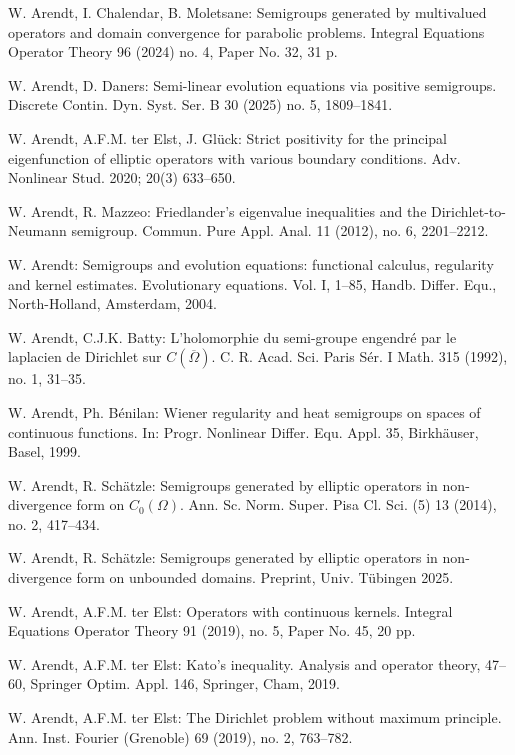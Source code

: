 \begin{thebibliography}{99}

 W. Arendt, I. Chalendar, B. Moletsane: Semigroups generated by multivalued operators and domain convergence for parabolic problems. Integral Equations Operator Theory 96 (2024) no. 4, Paper No. 32, 31 p.

 W. Arendt, D. Daners: Semi-linear evolution equations via positive semigroups. Discrete Contin. Dyn. Syst. Ser. B 30 (2025) no. 5, 1809--1841.

 W. Arendt, A.F.M. ter Elst, J. Glück: Strict positivity for the principal eigenfunction of elliptic operators with various boundary conditions. Adv. Nonlinear Stud. 2020; 20(3) 633--650.

 W. Arendt, R. Mazzeo: Friedlander's eigenvalue inequalities and the Dirichlet-to-Neumann semigroup. Commun. Pure Appl. Anal. 11 (2012), no. 6, 2201--2212.

 W. Arendt: Semigroups and evolution equations: functional calculus, regularity and kernel estimates. Evolutionary equations. Vol. I, 1--85, Handb. Differ. Equ., North-Holland, Amsterdam, 2004.

 W. Arendt, C.J.K. Batty: L'holomorphie du semi-groupe engendré par le laplacien de Dirichlet sur $C(\overline{\Omega})$. C. R. Acad. Sci. Paris Sér. I Math. 315 (1992), no. 1, 31--35.

 W. Arendt, Ph. Bénilan: Wiener regularity and heat semigroups on spaces of continuous functions. In: Progr. Nonlinear Differ. Equ. Appl. 35, Birkhäuser, Basel, 1999.

 W. Arendt, R. Schätzle: Semigroups generated by elliptic operators in non-divergence form on $C_0(\Omega)$. Ann. Sc. Norm. Super. Pisa Cl. Sci. (5) 13 (2014), no. 2, 417--434.

 W. Arendt, R. Schätzle: Semigroups generated by elliptic operators in non-divergence form on unbounded domains. Preprint, Univ. Tübingen 2025.

 W. Arendt, A.F.M. ter Elst: Operators with continuous kernels. Integral Equations Operator Theory 91 (2019), no. 5, Paper No. 45, 20 pp.

 W. Arendt, A.F.M. ter Elst: Kato's inequality. Analysis and operator theory, 47--60, Springer Optim. Appl. 146, Springer, Cham, 2019.

 W. Arendt, A.F.M. ter Elst: The Dirichlet problem without maximum principle. Ann. Inst. Fourier (Grenoble) 69 (2019), no. 2, 763--782.


\end{thebibliography}
